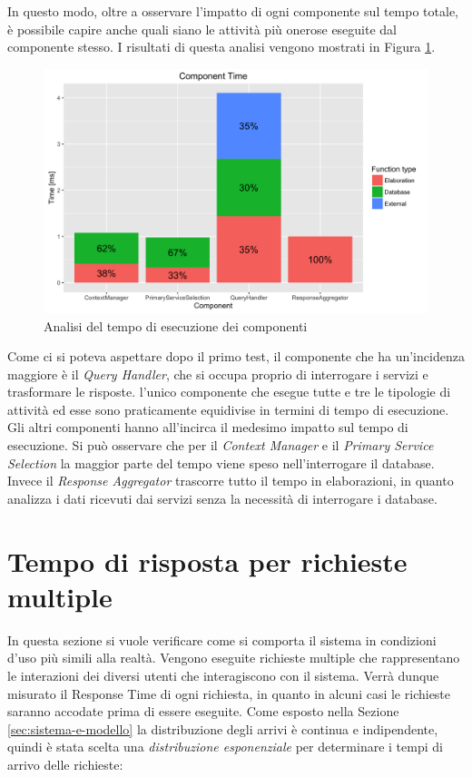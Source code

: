 In questo modo, oltre a osservare l'impatto di ogni componente sul tempo totale, è possibile capire anche quali siano le attività più onerose eseguite dal componente stesso. I risultati di questa analisi vengono mostrati in Figura \ref{fig:component-time}.

\begin{figure}[ht]
	\centering
	\includegraphics[width=\textwidth]{7-performance/Immagini/component_time.png}
	\caption{Analisi del tempo di esecuzione dei componenti}\label{fig:component-time}
\end{figure}

Come ci si poteva aspettare dopo il primo test, il componente che ha un'incidenza maggiore è il \emph{Query Handler}, che si occupa proprio di interrogare i servizi e trasformare le risposte. \upe l'unico componente che esegue tutte e tre le tipologie di attività ed esse sono praticamente equidivise in termini di tempo di esecuzione. Gli altri componenti hanno all'incirca il medesimo impatto sul tempo di esecuzione. Si può osservare che per il \emph{Context Manager} e il \emph{Primary Service Selection} la maggior parte del tempo viene speso nell'interrogare il database. Invece il \emph{Response Aggregator} trascorre tutto il tempo in elaborazioni, in quanto analizza i dati ricevuti dai servizi senza la necessità di interrogare i database.

\section{Tempo di risposta per richieste multiple\label{sec:analisi-response-time}}

In questa sezione si vuole verificare come si comporta il sistema in condizioni d'uso più simili alla realtà. Vengono eseguite richieste multiple che rappresentano le interazioni dei diversi utenti che interagiscono con il sistema. Verrà dunque misurato il Response Time di ogni richiesta, in quanto in alcuni casi le richieste saranno accodate prima di essere eseguite. Come esposto nella Sezione \ref{sec:sistema-e-modello} la distribuzione degli arrivi è continua e indipendente, quindi è stata scelta una \emph{distribuzione esponenziale} per determinare i tempi di arrivo delle richieste:

